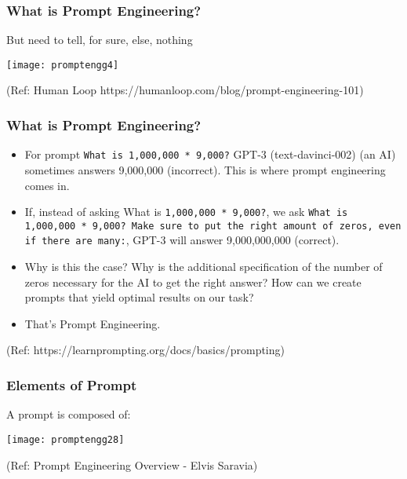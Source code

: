 \begin{frame}[fragile]\frametitle{What is Prompt Engineering?}

But need to tell, for sure, else, nothing


\begin{center}
\texttt{[image: promptengg4]}

{\tiny (Ref: Human Loop https://humanloop.com/blog/prompt-engineering-101)}

\end{center}				

\end{frame}


\begin{frame}[fragile]\frametitle{What is Prompt Engineering?}

\begin{itemize}
\item For prompt \lstinline|What is 1,000,000 * 9,000?| GPT-3 (text-davinci-002) (an AI) sometimes answers 9,000,000 (incorrect). This is where prompt engineering comes in.
\item If, instead of asking What is \lstinline|1,000,000 * 9,000?|, we ask \lstinline|What is 1,000,000 * 9,000? Make sure to put the right amount of zeros, even if there are many:|, GPT-3 will answer 9,000,000,000 (correct). 
\item Why is this the case? Why is the additional specification of the number of zeros necessary for the AI to get the right answer? How can we create prompts that yield optimal results on our task? 			
\item That's Prompt Engineering.
\end{itemize}

{\tiny (Ref: https://learnprompting.org/docs/basics/prompting)}
\end{frame}

\begin{frame}[fragile]\frametitle{Elements of Prompt}

A prompt is composed of:

\begin{center}
\texttt{[image: promptengg28]}

{\tiny (Ref: Prompt Engineering Overview - Elvis Saravia)}

\end{center}		
		
\end{frame}

